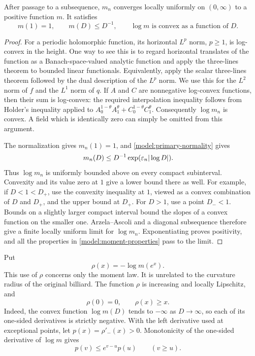 \begin{lemma}
\label{model:moment-compactness}
After passage to a subsequence, \(m_n\) converges locally uniformly on
\((0,\infty)\) to a positive function \(m\).  It satisfies
\begin{equation}
\label{model:moment-properties}
 m(1)=1,\qquad m(D)\le D^{-1},\qquad \log m
 \text{ is convex as a function of }D.
\end{equation}
\end{lemma}

\begin{proof}
For a periodic holomorphic function, its horizontal \(L^p\) norm,
\(p\ge1\), is log-convex in the height.  One way to see this is to regard
horizontal translates of the function as a Banach-space-valued analytic
function and apply the three-lines theorem to bounded linear functionals.
Equivalently, apply the scalar three-lines theorem followed by the dual
description of the \(L^p\) norm.  We use this for the \(L^2\) norm of \(f\)
and the \(L^1\) norm of \(q\).  If \(A\) and \(C\) are nonnegative
log-convex functions, then their sum is log-convex: the required
interpolation inequality follows from Holder's inequality applied to
\(A_0^{1-\theta}A_1^\theta+C_0^{1-\theta}C_1^\theta\).
Consequently \(\log m_n\) is convex.  A field which is identically zero
can simply be omitted from this argument.

The normalization gives \(m_n(1)=1\), and
\eqref{model:primary-normality} gives
\[
 m_n(D)\le D^{-1}\exp(\varepsilon_n|\log D|).
\]
Thus \(\log m_n\) is uniformly bounded above on every compact
subinterval.  Convexity and its value zero at \(1\) give a lower bound
there as well.  For example, if \(D<1<D_+\), use the convexity inequality
at \(1\), viewed as a convex combination of \(D\) and \(D_+\), and the
upper bound at \(D_+\).  For \(D>1\), use a point \(D_-<1\).
Bounds on a slightly larger compact interval bound the slopes of a
convex function on the smaller one.  Arzela--Ascoli and a diagonal
subsequence therefore give a finite locally uniform limit for
\(\log m_n\).  Exponentiating proves positivity, and all the properties
in \eqref{model:moment-properties} pass to the limit.
\end{proof}

Put
\begin{equation}
\label{model:rho-definition}
 \rho(x)=-\log m(e^x).
\end{equation}
This use of \(\rho\) concerns only the moment law.  It is unrelated to
the curvature radius of the original billiard.  The function \(\rho\)
is increasing and locally Lipschitz, and
\[
 \rho(0)=0,\qquad \rho(x)\ge x.
\]
Indeed, the convex function \(\log m(D)\) tends to \(-\infty\) as
\(D\to\infty\), so each of its one-sided derivatives is strictly
negative.  With the left derivative used at exceptional points, let
\(p(x)=\rho'_-(x)>0\).  Monotonicity of the one-sided derivative of
\(\log m\) gives
\begin{equation}
\label{model:slope-inequality}
 p(v)\le e^{v-u}p(u)\qquad(v\ge u).
\end{equation}

